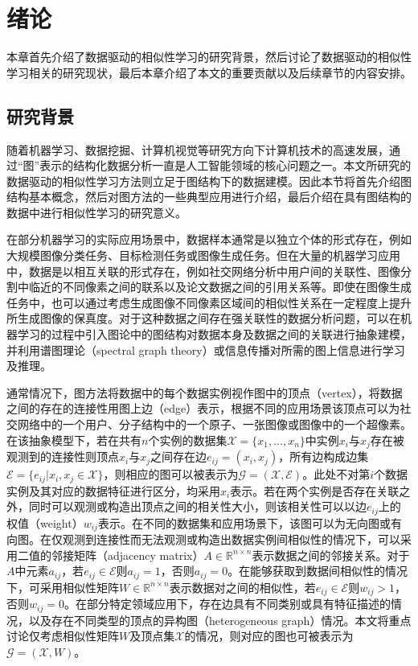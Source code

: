 \chapter{绪论}
本章首先介绍了数据驱动的相似性学习的研究背景，然后讨论了数据驱动的相似性学习相关的研究现状，最后本章介绍了本文的重要贡献以及后续章节的内容安排。
\section{研究背景}
随着机器学习、数据挖掘、计算机视觉等研究方向下计算机技术的高速发展，通过“图”\cite{chung1997spectral}表示的结构化数据分析一直是人工智能领域的核心问题之一。本文所研究的数据驱动的相似性学习方法则立足于图结构下的数据建模。因此本节将首先介绍图结构基本概念，然后对图方法的一些典型应用进行介绍，最后介绍在具有图结构的数据中进行相似性学习的研究意义。

在部分机器学习的实际应用场景中，数据样本通常是以独立个体的形式存在，例如大规模图像分类任务、目标检测任务或图像生成任务。但在大量的机器学习应用中，数据是以相互关联的形式存在，例如社交网络分析中用户间的关联性、图像分割中临近的不同像素之间的联系以及论文数据之间的引用关系等。即使在图像生成任务中，也可以通过考虑生成图像不同像素区域间的相似性关系在一定程度上提升所生成图像的保真度\cite{zhang2018self}。对于这种数据之间存在强关联性的数据分析问题，可以在机器学习的过程中引入图论中的图结构对数据本身及数据之间的关联进行抽象建模，并利用谱图理论（spectral graph theory）\cite{chung1997spectral}或信息传播对所需的图上信息进行学习及推理。

通常情况下，图方法将数据中的每个数据实例视作图中的顶点（vertex），将数据之间的存在的连接性用图上边（edge）表示，根据不同的应用场景该顶点可以为社交网络中的一个用户、分子结构中的一个原子、一张图像或图像中的一个超像素。在该抽象模型下，若在共有$n$个实例的数据集$\mathcal{X}=\{x_1,\dots,x_n\}$中实例$x_i$与$x_j$存在被观测到的连接性则顶点$x_i$与$x_j$之间存在边$e_{ij}=(x_i, x_j)$，所有边构成边集$\mathcal{E}=\{e_{ij}|x_i, x_j\in \mathcal{X}\}$，则相应的图可以被表示为$\mathcal{G} = (\mathcal{X}, \mathcal{E})$。此处不对第$i$个数据实例及其对应的数据特征进行区分，均采用$x_i$表示。若在两个实例是否存在关联之外，同时可以观测或构造出顶点之间的相关性大小，则该相关性可以以边$e_{ij}$上的权值（weight）$w_{ij}$表示。在不同的数据集和应用场景下，该图可以为无向图或有向图。在仅观测到连接性而无法观测或构造出数据实例间相似性的情况下，可以采用二值的邻接矩阵（adjacency matrix）$A\in\mathbb{R}^{n\times n}$表示数据之间的邻接关系。对于$A$中元素$a_{ij}$，若$e_{ij}\in \mathcal{E}$则$a_{ij}=1$，否则$a_{ij}=0$。在能够获取到数据间相似性的情况下，可采用相似性矩阵$W\in\mathbb{R}^{n\times n}$表示数据对之间的相似性，若$e_{ij}\in \mathcal{E}$则$w_{ij}>1$，否则$w_{ij}=0$。在部分特定领域应用下，存在边具有不同类别或具有特征描述的情况，以及存在不同类型的顶点的异构图（heterogeneous graph）情况。本文将重点讨论仅考虑相似性矩阵$W$及顶点集$\mathcal{X}$的情况，则对应的图也可被表示为$\mathcal{G} = (\mathcal{X}, W)$。

